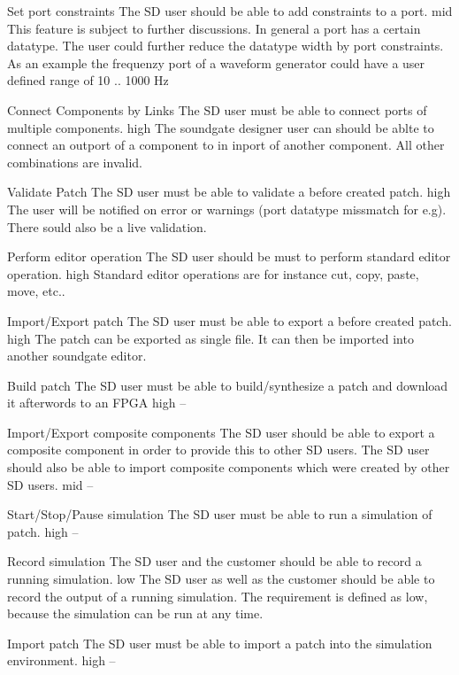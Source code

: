 	{Set port constraints}
	{The SD user should be able to add constraints to a port.}
	{mid}
	{This feature is subject to further discussions. In general a port has a certain datatype. The user could further reduce the datatype width by port constraints. As an example the frequenzy port of a waveform generator could have a user defined range of 10 .. 1000 Hz }
	
	{Connect Components by Links}
	{The SD user must be able to connect ports of multiple components.}
	{high}
	{The soundgate designer user can should be ablte to connect an outport of a component to in inport of another component. All other combinations are invalid.}
	
	{Validate Patch}
	{The SD user must be able to validate a before created patch.}
	{high}
	{The user will be notified on error or warnings (port datatype missmatch for e.g). There sould also be a live validation.}
	
	{Perform editor operation}
	{The SD user should be must to perform standard editor operation.}
	{high}
	{Standard editor operations are for instance cut, copy, paste, move, etc..}
	
	{Import/Export patch}
	{The SD user must be able to export a before created patch.}
	{high}
	{The patch can be exported as single file. It can then be imported into another soundgate editor.}
	
	{Build patch}
	{The SD user must be able to build/synthesize a patch and download it afterwords to an FPGA}
	{high}
	{--}
	
	{Import/Export composite components}
	{The SD user should be able to export a composite component in order to provide this to other SD users. The SD user should also be able to import composite components which were created by other SD users.}
	{mid}
	{--}
	
	{Start/Stop/Pause simulation}
	{The SD user must be able to run a simulation of patch.}
	{high}
	{--}
	
	{Record simulation}
	{The SD user and the customer should be able to record a running simulation.}
	{low}
	{The SD user as well as the customer should be able to record the output of a running simulation. The requirement is defined as low, because the simulation can be run at any time.}
	
	{Import patch}
	{The SD user must be able to import a patch into the simulation environment.}
	{high}
	{--}
	
